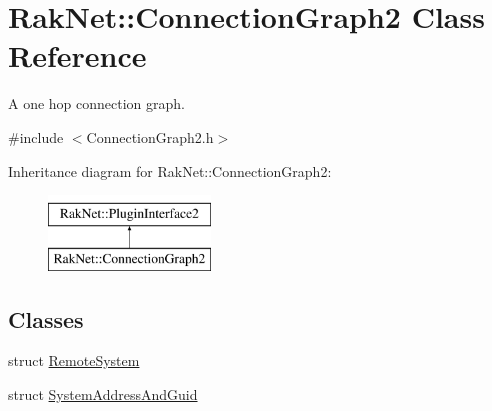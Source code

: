 \hypertarget{class_rak_net_1_1_connection_graph2}{\section{Rak\-Net\-:\-:Connection\-Graph2 Class Reference}
\label{class_rak_net_1_1_connection_graph2}
}


A one hop connection graph.  




{\ttfamily \#include $<$Connection\-Graph2.\-h$>$}

Inheritance diagram for Rak\-Net\-:\-:Connection\-Graph2\-:\begin{figure}[H]
\begin{center}
\leavevmode
\includegraphics[height=2.000000cm]{class_rak_net_1_1_connection_graph2}
\end{center}
\end{figure}
\subsection*{Classes}
\begin{DoxyCompactItemize}
\item 
struct \hyperlink{struct_rak_net_1_1_connection_graph2_1_1_remote_system}{Remote\-System}
\item 
struct \hyperlink{struct_rak_net_1_1_connection_graph2_1_1_system_address_and_guid}{System\-Address\-And\-Guid}
\end{DoxyCompactItemize}
